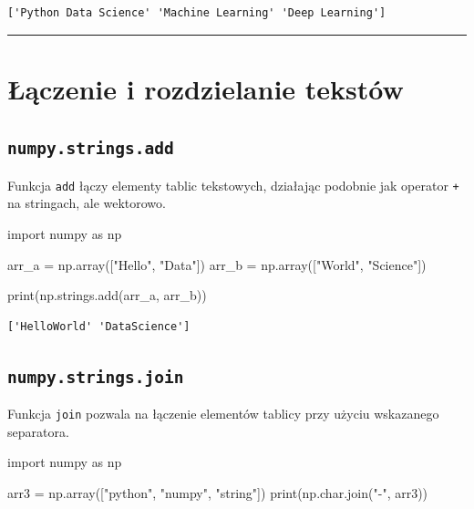 \documentclass[
  polish,
  letterpaper,
  DIV=11,
  numbers=noendperiod]{scrreprt}
\newenvironment{Shaded}{\begin{snugshade}}{\end{snugshade}}
\newcommand{\BuiltInTok}[1]{\textcolor[rgb]{0.00,0.23,0.31}{#1}}
\newcommand{\ImportTok}[1]{\textcolor[rgb]{0.00,0.46,0.62}{#1}}
\newcommand{\NormalTok}[1]{\textcolor[rgb]{0.00,0.23,0.31}{#1}}
\newcommand{\OperatorTok}[1]{\textcolor[rgb]{0.37,0.37,0.37}{#1}}
\newcommand{\StringTok}[1]{\textcolor[rgb]{0.13,0.47,0.30}{#1}}
\begin{document}
\begin{verbatim}
['Python Data Science' 'Machine Learning' 'Deep Learning']
\end{verbatim}

\begin{center}\rule{0.5\linewidth}{0.5pt}\end{center}

\section{Łączenie i rozdzielanie
tekstów}\label{ux142ux105czenie-i-rozdzielanie-tekstuxf3w}

\subsection{\texorpdfstring{\texttt{numpy.strings.add}}{numpy.strings.add}}\label{numpy.strings.add}

Funkcja \texttt{add} łączy elementy tablic tekstowych, działając
podobnie jak operator \texttt{+} na stringach, ale wektorowo.

\begin{Shaded}
\begin{Highlighting}[]
\ImportTok{import}\NormalTok{ numpy }\ImportTok{as}\NormalTok{ np}

\NormalTok{arr\_a }\OperatorTok{=}\NormalTok{ np.array([}\StringTok{"Hello"}\NormalTok{, }\StringTok{"Data"}\NormalTok{])}
\NormalTok{arr\_b }\OperatorTok{=}\NormalTok{ np.array([}\StringTok{"World"}\NormalTok{, }\StringTok{"Science"}\NormalTok{])}

\BuiltInTok{print}\NormalTok{(np.strings.add(arr\_a, arr\_b))}
\end{Highlighting}
\end{Shaded}

\begin{verbatim}
['HelloWorld' 'DataScience']
\end{verbatim}

\subsection{\texorpdfstring{\texttt{numpy.strings.join}}{numpy.strings.join}}\label{numpy.strings.join}

Funkcja \texttt{join} pozwala na łączenie elementów tablicy przy użyciu
wskazanego separatora.

\begin{Shaded}
\begin{Highlighting}[]
\ImportTok{import}\NormalTok{ numpy }\ImportTok{as}\NormalTok{ np}

\NormalTok{arr3 }\OperatorTok{=}\NormalTok{ np.array([}\StringTok{"python"}\NormalTok{, }\StringTok{"numpy"}\NormalTok{, }\StringTok{"string"}\NormalTok{])}
\BuiltInTok{print}\NormalTok{(np.char.join(}\StringTok{"{-}"}\NormalTok{, arr3))}
\end{Highlighting}
\end{Shaded}
\end{document}
